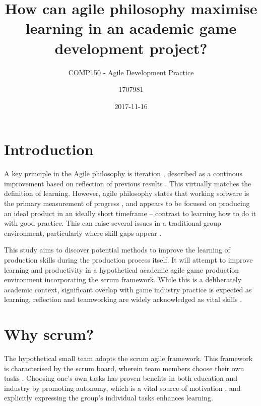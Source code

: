 \documentclass{scrartcl}
\title{How can agile philosophy maximise learning in an academic game development project?}
\subtitle{COMP150 - Agile Development Practice}
\date{2017-11-16}
\author{1707981}
\begin{document}
\maketitle
{}


\section{Introduction}
A key principle in the Agile philosophy is iteration \cite{agile}, described as a continous improvement based on reflection of previous results \cite{iteration}. This virtually matches the definition of learning. However, agile philosophy states that working software is the primary measurement of progress \cite{manifesto}, and appears to be focused on producing an ideal product in an ideally short timeframe -- contrast to learning how to do it with good practice. This can raise several issues in a traditional group environment, particularly where skill gaps appear \cite{group2003}.

This study aims to discover potential methods to improve the learning of production skills during the production process itself. It will attempt to improve learning and productivity in a hypothetical academic agile game production environment incorporating the scrum framework. While this is a deliberately academic context, significant overlap with game industry practice is expected as learning, reflection and teamworking are widely acknowledged as vital skills \cite{collaboration, devstudy}.


\section{Why scrum?}
The hypothetical small team adopts the scrum agile framework. This framework is characterised by the scrum board, wherein team members choose their own tasks \cite{scrum}. Choosing one's own tasks has proven benefits in both education and industry by promoting autonomy, which is a vital source of motivation \cite{motivation}, and explicitly expressing the group's individual tasks enhances learning. \cite{group2005}
\end{document}
